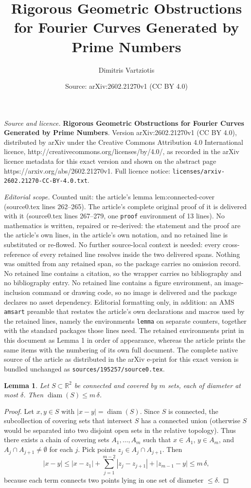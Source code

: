 \documentclass[10pt,a4paper]{amsart}
\title{\textbf{Rigorous Geometric Obstructions for Fourier Curves Generated by Prime Numbers}}
\author{Dimitris Vartziotis}
\date{Source: arXiv:2602.21270v1 (CC BY 4.0)}
\newtheorem{lemma}{Lemma}
\newcommand{\R}{\mathbb{R}}
\DeclareMathOperator{\diam}{diam}
\begin{document}
\maketitle

\noindent\emph{Source and licence.} \textbf{Rigorous Geometric Obstructions for Fourier Curves Generated by Prime Numbers}. Version arXiv:2602.21270v1 (CC BY 4.0), distributed by arXiv under the Creative Commons Attribution 4.0 International licence, http://creativecommons.org/licenses/by/4.0/, as recorded in the arXiv licence metadata for this exact version and shown on the abstract page https://arxiv.org/abs/2602.21270v1. Full licence notice: \texttt{licenses/arxiv-2602.21270-CC-BY-4.0.txt}.\par\smallskip

\noindent\textit{Editorial scope.} Counted unit: the article's lemma lem:connected-cover (source0.tex lines 262--265). The article's complete original proof of it is delivered with it (source0.tex lines 267--279, one \texttt{proof} environment of 13 lines). No mathematics is written, repaired or re-derived: the statement and the proof are the article's own lines, in the article's own notation, and no retained line is substituted or re-flowed.  No further source-local context is needed: every cross-reference of every retained line resolves inside the two delivered spans.  Nothing was omitted from any retained span, so the package carries no omission record.  No retained line contains a citation, so the wrapper carries no bibliography and no bibliography entry.  No retained line contains a figure environment, an image-inclusion command or drawing code, so no image is delivered and the package declares no asset dependency.  Editorial formatting only, in addition: an AMS \texttt{amsart} preamble that restates the article's own declarations and macros used by the retained lines, namely the environments \texttt{lemma} on separate counters, together with the standard packages those lines need.  The retained environments print in this document as Lemma 1 in order of appearance, whereas the article prints the same items with the numbering of its own full document.  The complete native source of the article as distributed in the arXiv e-print for this exact version is bundled unchanged as \texttt{sources/195257/source0.tex}.
\begin{lemma}\label{lem:connected-cover}
Let $S\subset\R^2$ be connected and covered by $m$ sets, each of diameter at most $\delta$.
Then $\diam(S)\le m\,\delta$.
\end{lemma}

\begin{proof}
Let $x,y\in S$ with $|x-y|=\diam(S)$.
Since $S$ is connected, the subcollection of covering sets that intersect $S$ has a connected union (otherwise $S$ would be separated into two disjoint open sets in the relative topology).
Thus there exists a chain of covering sets $A_1,\dots,A_m$ such that $x\in A_1$, $y\in A_m$, and $A_j\cap A_{j+1}\neq\emptyset$ for each $j$.
Pick points $z_j\in A_j\cap A_{j+1}$.
Then
\[
|x-y|
\le |x-z_1|+\sum_{j=1}^{m-2}|z_j-z_{j+1}|+|z_{m-1}-y|
\le m\,\delta,
\]
because each term connects two points lying in one set of diameter $\le\delta$.
\end{proof}
\end{document}
